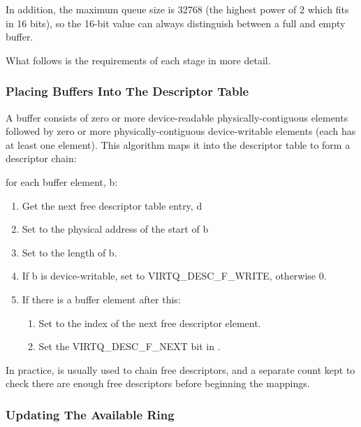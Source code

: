 In addition, the maximum queue size is 32768 (the highest power
of 2 which fits in 16 bits), so the 16-bit  value can always
distinguish between a full and empty buffer.

What follows is the requirements of each stage in more detail.

\subsubsection{Placing Buffers Into The Descriptor Table}\label{sec:Basic Facilities of a Virtio Device / Virtqueues / Supplying Buffers to The Device / Placing Buffers Into The Descriptor Table}

A buffer consists of zero or more device-readable physically-contiguous
elements followed by zero or more physically-contiguous
device-writable elements (each has at least one element). This
algorithm maps it into the descriptor table to form a descriptor
chain:

for each buffer element, b:

\begin{enumerate}
\item Get the next free descriptor table entry, d
\item Set  to the physical address of the start of b
\item Set  to the length of b.
\item If b is device-writable, set  to VIRTQ_DESC_F_WRITE,
    otherwise 0.
\item If there is a buffer element after this:
    \begin{enumerate}
    \item Set  to the index of the next free descriptor
      element.
    \item Set the VIRTQ_DESC_F_NEXT bit in .
    \end{enumerate}
\end{enumerate}

In practice,  is usually used to chain free
descriptors, and a separate count kept to check there are enough
free descriptors before beginning the mappings.

\subsubsection{Updating The Available Ring}\label{sec:Basic Facilities of a Virtio Device / Virtqueues / Supplying Buffers to The Device / Updating The Available Ring}

